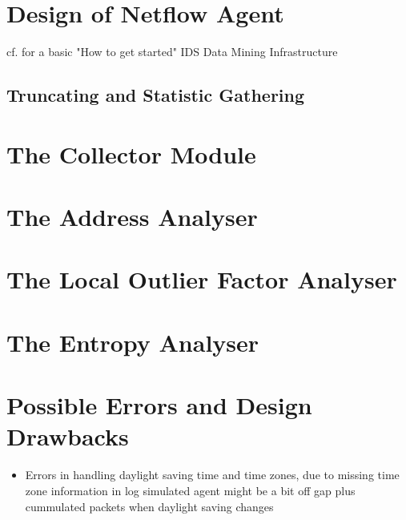 \section{Design of Netflow Agent}
\label{sec:concept:agent}
cf. \textcite{Bloedorn2001} for a basic "How to get started" IDS Data Mining Infrastructure
\subsection{Truncating and Statistic Gathering}

\section{The Collector Module}
\label{sec:concept:collector}

\section{The Address Analyser}
\label{sec:concept:addr}

\section{The Local Outlier Factor Analyser}
\label{sec:concept:lof}

\section{The Entropy Analyser}
\label{sec:concept:entropy}

\section{Possible Errors and Design Drawbacks}
\label{sec:concept:flaws}
\begin{itemize}
	\item Errors in handling daylight saving time and time zones, due to missing time zone information in log
		\subitem simulated agent might be a bit off
		\subitem gap plus cummulated packets when daylight saving changes
\end{itemize}
